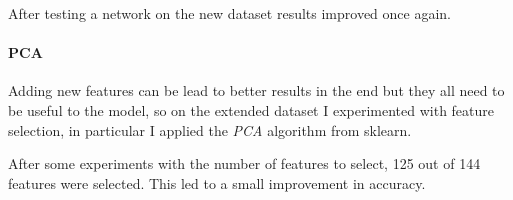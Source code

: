After testing a network on the new dataset results improved once again.

\paragraph{PCA}
Adding new features can be lead to better results 
in the end but they all need to be useful to the model, so on 
the extended dataset I experimented with feature selection, 
in particular I applied the \emph{PCA} algorithm from sklearn.

After some experiments with the number of features to select, 125 out of 144 
features were selected. This led to a small improvement in accuracy.